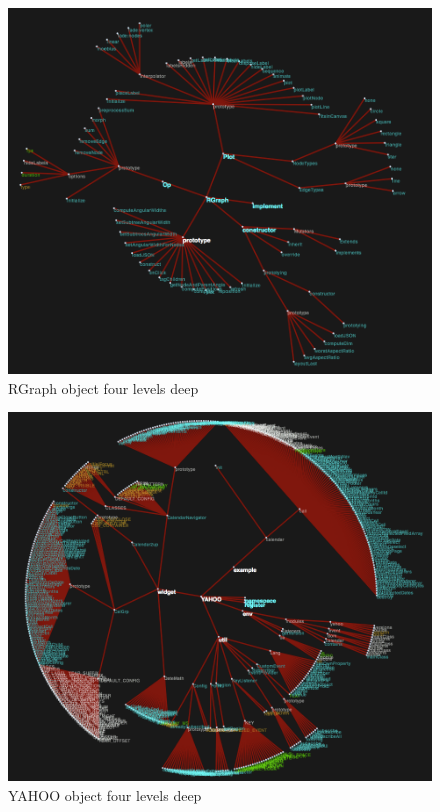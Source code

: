 \documentclass[]{article}
\begin{document}
\begin{figure}[h]
  \begin{center}
    \includegraphics[scale=.2]{rgraph.png}
  \end{center}
  \caption{RGraph object four levels deep}
  \label{fig:rgraph}
\end{figure}

\begin{figure}[h]
  \begin{center}
    \includegraphics[scale=.2]{yahoo.png}
  \end{center}
  \caption{YAHOO object four levels deep}
  \label{fig:yahoo}
\end{figure}
\end{document}
